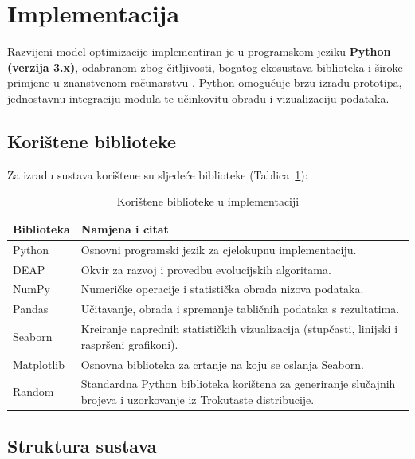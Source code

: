 
\section{Implementacija}

Razvijeni model optimizacije implementiran je u programskom jeziku \textbf{Python (verzija 3.x)}, odabranom zbog čitljivosti, bogatog ekosustava biblioteka i široke primjene u znanstvenom računarstvu \cite{PythonSoftwareFoundation}. Python omogućuje brzu izradu prototipa, jednostavnu integraciju modula te učinkovitu obradu i vizualizaciju podataka.

\subsection{Korištene biblioteke}

Za izradu sustava korištene su sljedeće biblioteke (Tablica~\ref{tab:biblioteke}):

\begin{table}[H]
\centering
\caption{Korištene biblioteke u implementaciji}
\label{tab:biblioteke}
\begin{tabular}{|l|p{10cm}|}
\hline
\textbf{Biblioteka} & \textbf{Namjena i citat} \\ \hline
Python & Osnovni programski jezik za cjelokupnu implementaciju. \cite{PythonSoftwareFoundation} \\ \hline
DEAP & Okvir za razvoj i provedbu evolucijskih algoritama. \cite{DEAP2012} \\ \hline
NumPy & Numeričke operacije i statistička obrada nizova podataka. \cite{Harris2020} \\ \hline
Pandas & Učitavanje, obrada i spremanje tabličnih podataka s rezultatima. \cite{PandasDevelopmentTeam2020} \\ \hline
Seaborn & Kreiranje naprednih statističkih vizualizacija (stupčasti, linijski i raspršeni grafikoni). \cite{Waskom2021} \\ \hline
Matplotlib & Osnovna biblioteka za crtanje na koju se oslanja Seaborn. \cite{Hunter2007} \\ \hline
Random & Standardna Python biblioteka korištena za generiranje slučajnih brojeva i uzorkovanje iz Trokutaste distribucije. \\ \hline
\end{tabular}
\end{table}

\subsection{Struktura sustava}



